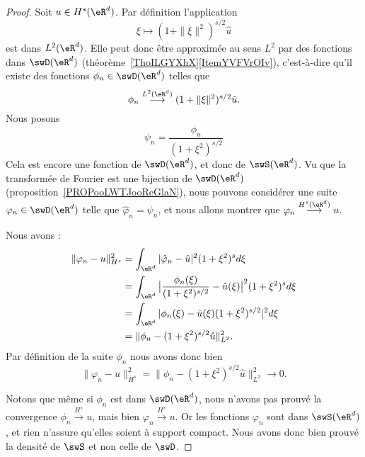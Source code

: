 \begin{proof}
	Soit $u\in H^s(\eR^d)$. Par définition l'application
	\begin{equation}
		\xi\mapsto (1+\| \xi \|^2)^{s/2}\hat u
	\end{equation}
	est dans \( L^2(\eR^d)\). Elle peut donc être approximée au sens \( L^2\) par des fonctions dans \( \swD(\eR^d)\) (théorème~\ref{ThoILGYXhX}\ref{ItemYVFVrOIv}), c'est-à-dire qu'il existe des fonctions \( \phi_n\in\swD(\eR^d)\) telles que
	\begin{equation}
		\phi_n\stackrel{L^2(\eR^d)}{\longrightarrow}(1+\| \xi \|^2)^{s/2}\hat u.
	\end{equation}
	Nous posons
	\begin{equation}
		\psi_n=\frac{ \phi_n }{ (1+\xi^2)^{s/2} }
	\end{equation}
	Cela est encore une fonction de \( \swD(\eR^d)\), et donc de \( \swS(\eR^d)\). Vu que la transformée de Fourier est une bijection de \( \swD(\eR^d)\) (proposition~\ref{PROPooLWTJooReGlaN}), nous pouvons considérer une suite \( \varphi_n\in\swD(\eR^d)\) telle que \( \hat \varphi_n=\psi_n \), et nous allons montrer que \( \varphi_n\stackrel{H^s(\eR^d)}{\longrightarrow}u\).

	Nous avons :
	\begin{subequations}
		\begin{align}
			\| \varphi_n-u \|^2_{H^s} & =\int_{\eR^d}| \hat \varphi_n-\hat u |^2(1+\xi^2)^sd\xi                                       \\
			                          & =\int_{\eR^d}\big| \frac{ \phi_n(\xi) }{ (1+\xi^2)^{s/2} }-\hat u(\xi) \big|^2(1+\xi^2)^sd\xi \\
			                          & =\int_{\eR^d}| \phi_n(\xi)-\hat u(\xi)(1+\xi^2)^{s/2} |^2d\xi                                 \\
			                          & =\| \phi_n-(1+\xi^2)^{s/2}\hat u \|^2_{L^2}.
		\end{align}
	\end{subequations}
	Par définition de la suite \( \phi_n\) nous avons donc bien
	\begin{equation}
		\| \varphi_n-u \|^2_{H^s} =\| \phi_n-(1+\xi^2)^{s/2}\hat u \|^2_{L^2}\to 0.
	\end{equation}

	Notons que même si \( \phi_n\) est dans \( \swD(\eR^d)\), nous n'avons pas prouvé la convergence \( \phi_n\stackrel{H^s}{\longrightarrow}u\), mais bien \( \varphi_n\stackrel{H^s}{\longrightarrow}u\). Or les fonctions \( \varphi_n\) sont dans \( \swS(\eR^d)\), et rien n'assure qu'elles soient à support compact. Nous avons donc bien prouvé la densité de \( \swS\) et non celle de \( \swD\).
\end{proof}

